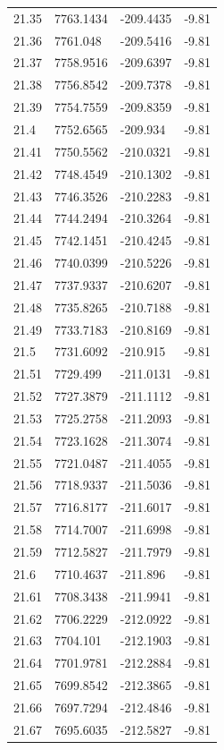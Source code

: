 \begin{table}[H]
\begin{tabular}{llll}
21.35 & 7763.1434 & -209.4435 & -9.81 \\
21.36 & 7761.048 & -209.5416 & -9.81 \\
21.37 & 7758.9516 & -209.6397 & -9.81 \\
21.38 & 7756.8542 & -209.7378 & -9.81 \\
21.39 & 7754.7559 & -209.8359 & -9.81 \\
21.4 & 7752.6565 & -209.934 & -9.81 \\
21.41 & 7750.5562 & -210.0321 & -9.81 \\
21.42 & 7748.4549 & -210.1302 & -9.81 \\
21.43 & 7746.3526 & -210.2283 & -9.81 \\
21.44 & 7744.2494 & -210.3264 & -9.81 \\
21.45 & 7742.1451 & -210.4245 & -9.81 \\
21.46 & 7740.0399 & -210.5226 & -9.81 \\
21.47 & 7737.9337 & -210.6207 & -9.81 \\
21.48 & 7735.8265 & -210.7188 & -9.81 \\
21.49 & 7733.7183 & -210.8169 & -9.81 \\
21.5 & 7731.6092 & -210.915 & -9.81 \\
21.51 & 7729.499 & -211.0131 & -9.81 \\
21.52 & 7727.3879 & -211.1112 & -9.81 \\
21.53 & 7725.2758 & -211.2093 & -9.81 \\
21.54 & 7723.1628 & -211.3074 & -9.81 \\
21.55 & 7721.0487 & -211.4055 & -9.81 \\
21.56 & 7718.9337 & -211.5036 & -9.81 \\
21.57 & 7716.8177 & -211.6017 & -9.81 \\
21.58 & 7714.7007 & -211.6998 & -9.81 \\
21.59 & 7712.5827 & -211.7979 & -9.81 \\
21.6 & 7710.4637 & -211.896 & -9.81 \\
21.61 & 7708.3438 & -211.9941 & -9.81 \\
21.62 & 7706.2229 & -212.0922 & -9.81 \\
21.63 & 7704.101 & -212.1903 & -9.81 \\
21.64 & 7701.9781 & -212.2884 & -9.81 \\
21.65 & 7699.8542 & -212.3865 & -9.81 \\
21.66 & 7697.7294 & -212.4846 & -9.81 \\
21.67 & 7695.6035 & -212.5827 & -9.81 \\

\end{tabular}
\end{table}
